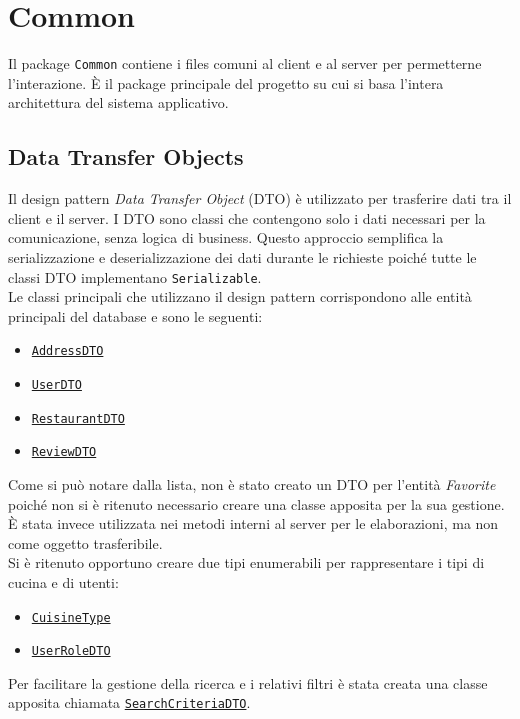 \section{Common}
Il package \texttt{Common} contiene i files comuni al 
client e al server per permetterne l'interazione.
\`E il package principale del progetto su cui si basa 
l'intera architettura del sistema applicativo.

\subsection{Data Transfer Objects}
Il design pattern \textit{Data Transfer Object} (DTO) è 
utilizzato per trasferire dati tra il client e il server. 
I DTO sono classi che contengono solo i dati necessari per la 
comunicazione, senza logica di business. 
Questo approccio semplifica la serializzazione e deserializzazione 
dei dati durante le richieste poiché tutte le classi DTO 
implementano \texttt{Serializable}.\\
Le classi principali che utilizzano il design pattern corrispondono 
alle entità principali del database e sono le seguenti:
\begin{itemize}
    \item \texttt{\hyperref[sec:addressdto]{AddressDTO}}
    \item \texttt{\hyperref[sec:userdto]{UserDTO}}
    \item \texttt{\hyperref[sec:restaurantdto]{RestaurantDTO}}
    \item \texttt{\hyperref[sec:reviewdto]{ReviewDTO}}
\end{itemize}
Come si può notare dalla lista, non è stato creato un DTO per
l'entità \textit{Favorite} poiché non si è ritenuto necessario 
creare una classe apposita per la sua gestione. 
\`E stata invece utilizzata nei metodi interni al server per le 
elaborazioni, ma non come oggetto trasferibile.\\
Si è ritenuto opportuno creare due tipi enumerabili
per rappresentare i tipi di cucina e di utenti:
\begin{itemize}
    \item \texttt{\hyperref[sec:cuisinetype]{CuisineType}}
    \item \texttt{\hyperref[sec:userroledto]{UserRoleDTO}}
\end{itemize}
Per facilitare la gestione della ricerca e i relativi filtri è 
stata creata una classe apposita chiamata 
\texttt{\hyperref[sec:searchcriteriadto]{SearchCriteriaDTO}}.

